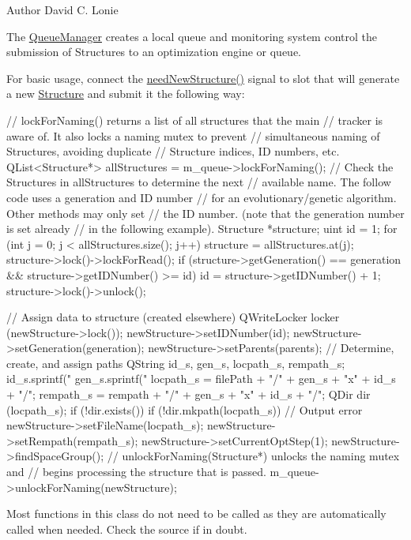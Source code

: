 \begin{DoxyAuthor}{Author}
David C. Lonie
\end{DoxyAuthor}
The \hyperlink{classGlobalSearch_1_1QueueManager}{Queue\+Manager} creates a local queue and monitoring system control the submission of Structures to an optimization engine or queue.

For basic usage, connect the \hyperlink{classGlobalSearch_1_1QueueManager_a4b50dbd51e53b1d0d5cb93e9d7380c1c}{need\+New\+Structure()} signal to slot that will generate a new \hyperlink{classGlobalSearch_1_1Structure}{Structure} and submit it the following way\+: \begin{DoxyVerb}// lockForNaming() returns a list of all structures that the main
// tracker is aware of. It also locks a naming mutex to prevent
// simultaneous naming of Structures, avoiding duplicate
// Structure indices, ID numbers, etc.
QList<Structure*> allStructures = m_queue->lockForNaming();
// Check the Structures in allStructures to determine the next
// available name. The follow code uses a generation and ID number
// for an evolutionary/genetic algorithm. Other methods may only set
// the ID number. (note that the generation number is set already
// in the following example).
Structure *structure;
uint id = 1;
for (int j = 0; j < allStructures.size(); j++) {
  structure = allStructures.at(j);
  structure->lock()->lockForRead();
  if (structure->getGeneration() == generation &&
      structure->getIDNumber() >= id) {
    id = structure->getIDNumber() + 1;
  }
  structure->lock()->unlock();
}

// Assign data to structure (created elsewhere)
QWriteLocker locker (newStructure->lock());
newStructure->setIDNumber(id);
newStructure->setGeneration(generation);
newStructure->setParents(parents);
// Determine, create, and assign paths
QString id_s, gen_s, locpath_s, rempath_s;
id_s.sprintf("%
gen_s.sprintf("%
locpath_s = filePath + "/" + gen_s + "x" + id_s + "/";
rempath_s = rempath + "/" + gen_s + "x" + id_s + "/";
QDir dir (locpath_s);
if (!dir.exists()) {
  if (!dir.mkpath(locpath_s)) {
    // Output error
  }
}
newStructure->setFileName(locpath_s);
newStructure->setRempath(rempath_s);
newStructure->setCurrentOptStep(1);
newStructure->findSpaceGroup();
// unlockForNaming(Structure*) unlocks the naming mutex and
// begins processing the structure that is passed.
m_queue->unlockForNaming(newStructure);
\end{DoxyVerb}
 \begin{DoxyVerb} Most functions in this class do not need to be called as they are
 automatically called when needed. Check the source if in doubt.\end{DoxyVerb}
 

